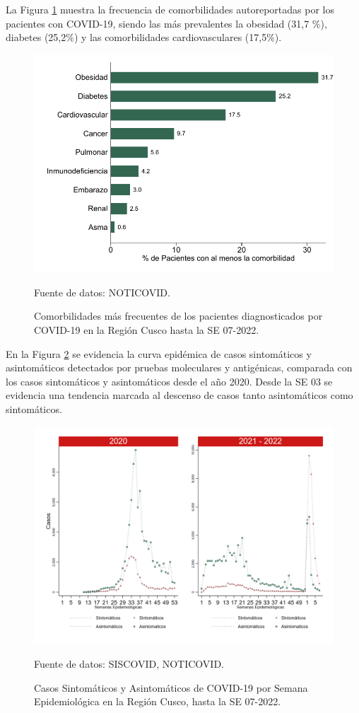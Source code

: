 \documentclass[12pt,a4paper,openany]{book}
\begin{document}
La Figura \ref{fig:comorbilidades} muestra la frecuencia de comorbilidades autoreportadas por los pacientes con COVID-19, siendo las más prevalentes la obesidad (31,7 $\%$), diabetes (25,2$\%$) y las comorbilidades cardiovasculares (17,5$\%$).  
\begin{figure}[h]
	\caption{Comorbilidades más frecuentes de los pacientes diagnosticados por COVID-19 en la Región Cusco hasta la SE 07-2022. }\label{fig:comorbilidades}
	\begin{center}
		\includegraphics[width=0.65\linewidth]{../figuras/figura_comorbilidad.pdf}
	\end{center}
	{\footnotesize {Fuente de datos: NOTICOVID.}}
\end{figure}
\clearpage
 En la Figura \ref{fig:sintomaticos_asintomati} se evidencia la curva epidémica de casos sintomáticos y asintomáticos detectados por pruebas moleculares y antigénicas, comparada con los casos sintomáticos y asintomáticos desde el año 2020. Desde la SE 03 se evidencia una tendencia marcada al descenso de casos tanto asintomáticos como sintomáticos. 
 
\begin{figure}[h]
	\caption{Casos Sintomáticos y Asintomáticos de COVID-19 por Semana Epidemiológica en la Región Cusco, hasta la SE 07-2022.  }\label{fig:sintomaticos_asintomati}
	
	\begin{center}
		\includegraphics[width=0.75\linewidth]{../figuras/sintomaticos_20_21_22.png}
	\end{center}
	{\footnotesize {Fuente de datos: SISCOVID, NOTICOVID.}}
\end{figure}
\clearpage
\end{document}
